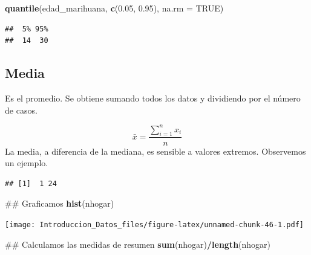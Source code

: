 \documentclass[spanish,]{book}
\newenvironment{Shaded}{\begin{snugshade}}{\end{snugshade}}
\newcommand{\KeywordTok}[1]{\textcolor[rgb]{0.13,0.29,0.53}{\textbf{#1}}}
\newcommand{\DataTypeTok}[1]{\textcolor[rgb]{0.13,0.29,0.53}{#1}}
\newcommand{\FloatTok}[1]{\textcolor[rgb]{0.00,0.00,0.81}{#1}}
\newcommand{\StringTok}[1]{\textcolor[rgb]{0.31,0.60,0.02}{#1}}
\newcommand{\OtherTok}[1]{\textcolor[rgb]{0.56,0.35,0.01}{#1}}
\newcommand{\OperatorTok}[1]{\textcolor[rgb]{0.81,0.36,0.00}{\textbf{#1}}}
\newcommand{\NormalTok}[1]{#1}
\begin{document}
\begin{Shaded}
\begin{Highlighting}[]
\KeywordTok{quantile}\NormalTok{(edad_marihuana, }\KeywordTok{c}\NormalTok{(}\FloatTok{0.05}\NormalTok{, }\FloatTok{0.95}\NormalTok{), }\DataTypeTok{na.rm =} \OtherTok{TRUE}\NormalTok{)}
\end{Highlighting}
\end{Shaded}

\begin{verbatim}
##  5% 95% 
##  14  30
\end{verbatim}

\subsection{Media}\label{media}

Es el promedio. Se obtiene sumando todos los datos y dividiendo por el
número de casos.

\[
\bar{x} = \frac{\displaystyle \sum_{i=1}^n x_i}{n}
\] La media, a diferencia de la mediana, es sensible a valores extremos.
Observemos un ejemplo.

\begin{Shaded}
\end{Shaded}

\begin{verbatim}
## [1]  1 24
\end{verbatim}

\begin{Shaded}
\begin{Highlighting}[]
\NormalTok{## Graficamos}
\KeywordTok{hist}\NormalTok{(nhogar)}
\end{Highlighting}
\end{Shaded}

\texttt{[image: Introduccion\_Datos\_files/figure-latex/unnamed-chunk-46-1.pdf]}

\begin{Shaded}
\begin{Highlighting}[]
\NormalTok{## Calculamos las medidas de resumen}
\KeywordTok{sum}\NormalTok{(nhogar)}\OperatorTok{/}\KeywordTok{length}\NormalTok{(nhogar)}
\end{Highlighting}
\end{Shaded}
\end{document}
